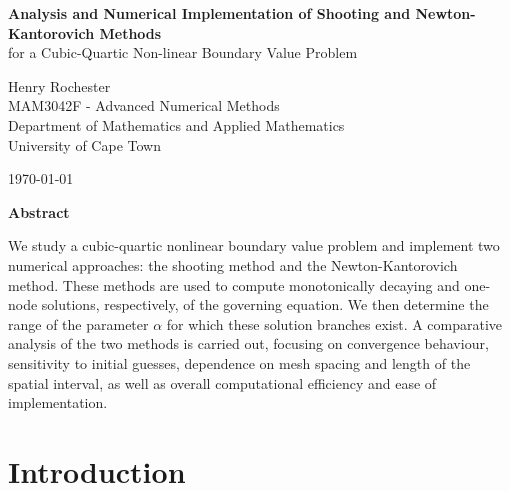 \documentclass[12pt]{article}
\begin{document}
\begin{titlepage}
\centering

\vspace*{1.5cm}

{\LARGE \textbf{Analysis and Numerical Implementation of Shooting and Newton-Kantorovich Methods}}\\[0.3cm]

{\large for a Cubic-Quartic Non-linear Boundary Value Problem}

\vspace{1.2cm}

{\large Henry Rochester}\\[0.5cm]

{\large
MAM3042F - Advanced Numerical Methods \\[0.3cm]
Department of Mathematics and Applied Mathematics \\ 
University of Cape Town
}

\vspace{1cm}

{\large \today}

\vspace{1.5cm}

\textbf{Abstract}

\vspace{0.5cm}

\begin{minipage}{0.85\textwidth}
\small
We study a cubic-quartic nonlinear boundary value problem and implement two numerical approaches: the shooting method and the Newton-Kantorovich method. These methods are used to compute monotonically decaying and one-node solutions, respectively, of the governing equation. We then determine the range of the parameter $\alpha$ for which these solution branches exist. A comparative analysis of the two methods is carried out, focusing on convergence behaviour, sensitivity to initial guesses, dependence on mesh spacing and length of the spatial interval, as well as overall computational efficiency and ease of implementation.
\end{minipage}

\vfill

\end{titlepage}


\section*{Introduction}
\end{document}
